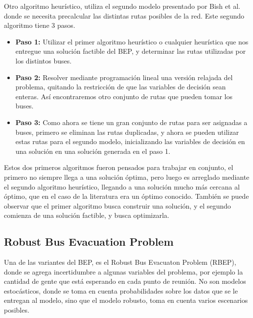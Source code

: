 \documentclass[letter, 10pt]{article}
\begin{document}
Otro algoritmo heurístico, utiliza el segundo modelo presentado por Bish et al. \cite{bish2011planning} donde se necesita precalcular las distintas rutas posibles de la red. Este segundo algoritmo tiene 3 pasos.

\begin{itemize}
\item \textbf{Paso 1:} Utilizar el primer algoritmo heurístico o cualquier heurística que nos entregue una solución factible del BEP, y determinar las rutas utilizadas por los distintos buses.

\item \textbf{Paso 2:} Resolver mediante programación lineal una versión relajada del problema, quitando la restricción de que las variables de decisión sean enteras. Así encontraremos otro conjunto de rutas que pueden tomar los buses.

\item \textbf{Paso 3:} Como ahora se tiene un gran conjunto de rutas para ser asignadas a buses, primero se eliminan las rutas duplicadas, y ahora se pueden utilizar estas rutas para el segundo modelo, inicializando las variables de decisión en una solución en una solución generada en el paso 1.
\end{itemize}

Estos dos primeros algoritmos fueron pensados para trabajar en conjunto, el primero no siempre llega a una solución óptima, pero luego es arreglado mediante el segundo algoritmo heurístico, llegando a una solución mucho más cercana al óptimo, que en el caso de la literatura era un óptimo conocido. También se puede observar que el primer algoritmo busca construir una solución, y el segundo comienza de una solución factible, y busca optimizarla.




\subsection{Robust Bus Evacuation Problem}

Una de las variantes del BEP, es el Robust Bus Evacuaton Problem (RBEP), donde se agrega incertidumbre a algunas variables del problema, por ejemplo la cantidad de gente que está esperando en cada punto de reunión. No son modelos estocásticos, donde se toma en cuenta probabilidades sobre los datos que se le entregan al modelo, sino que el modelo robusto, toma en cuenta varios escenarios posibles.
\end{document}
